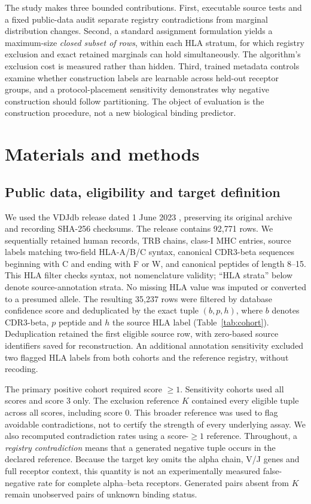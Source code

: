 \documentclass[pdflatex,sn-basic]{sn-jnl}
\begin{document}
The study makes three bounded contributions. First, executable source tests and a fixed public-data audit separate registry contradictions from marginal distribution changes. Second, a standard assignment formulation yields a maximum-size \emph{closed subset of rows}, within each HLA stratum, for which registry exclusion and exact retained marginals can hold simultaneously. The algorithm's exclusion cost is measured rather than hidden. Third, trained metadata controls examine whether construction labels are learnable across held-out receptor groups, and a protocol-placement sensitivity demonstrates why negative construction should follow partitioning. The object of evaluation is the construction procedure, not a new biological binding predictor.

\section{Materials and methods}\label{sec:methods}
\subsection{Public data, eligibility and target definition}
We used the VDJdb release dated 1 June 2023 \citep{Shugay2018}, preserving its original archive and recording SHA-256 checksums. The release contains 92,771 rows. We sequentially retained human records, TRB chains, class-I MHC entries, source labels matching two-field HLA-A/B/C syntax, canonical CDR3-beta sequences beginning with C and ending with F or W, and canonical peptides of length 8--15. This HLA filter checks syntax, not nomenclature validity; ``HLA strata'' below denote source-annotation strata. No missing HLA value was imputed or converted to a presumed allele. The resulting 35,237 rows were filtered by database confidence score and deduplicated by the exact tuple $(b,p,h)$, where $b$ denotes CDR3-beta, $p$ peptide and $h$ the source HLA label (Table~\ref{tab:cohort}). Deduplication retained the first eligible source row, with zero-based source identifiers saved for reconstruction. An additional annotation sensitivity excluded two flagged HLA labels from both cohorts and the reference registry, without recoding.

The primary positive cohort required score $\geq1$. Sensitivity cohorts used all scores and score 3 only. The exclusion reference $K$ contained every eligible tuple across all scores, including score 0. This broader reference was used to flag avoidable contradictions, not to certify the strength of every underlying assay. We also recomputed contradiction rates using a score-$\geq1$ reference. Throughout, a \emph{registry contradiction} means that a generated negative tuple occurs in the declared reference. Because the target key omits the alpha chain, V/J genes and full receptor context, this quantity is not an experimentally measured false-negative rate for complete alpha--beta receptors. Generated pairs absent from $K$ remain unobserved pairs of unknown binding status.
\end{document}

